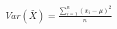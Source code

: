 \documentclass[preview]{standalone}
\begin{document}
\begin{align*}
Var(\bar{X}) = \frac{\sum_{i=1}^{n}(x_i - \mu)^2}{n}
\end{align*}
\end{document}
